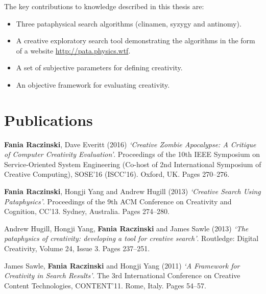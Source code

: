 The key contributions to knowledge described in this thesis are:

\begin{itemize}
  \item Three pataphysical search algorithms (clinamen, syzygy and antinomy).
  \item A creative exploratory search tool demonstrating the algorithms in the form of a website \url{http://pata.physics.wtf}.
  \item A set of subjective parameters for defining creativity.
  \item An objective framework for evaluating creativity.
\end{itemize}

\begin{comment}
  abusing tech in creative ways can yield useful results
  pataphysics = Creativity

  combining the pseudo philosophy of pataphysics with semantically structured algorithms which use programming APIs and computational linguistics to produce original creative works.

  overturn expectations
  subvert browsing
  undermine relevance
  corrupt results
\end{comment}


\section{Publications}

\textbf{Fania Raczinski}, Dave Everitt (2016) \emph{`Creative Zombie Apocalypse: A Critique of Computer Creativity Evaluation'}. Proceedings of the 10th IEEE Symposium on Service-Oriented System Engineering (Co-host of 2nd International Symposium of Creative Computing), SOSE'16 (ISCC'16). Oxford, UK. Pages 270--276.

\textbf{Fania Raczinski}, Hongji Yang and Andrew Hugill (2013) \emph{`Creative Search Using Pataphysics'}. Proceedings of the 9th ACM Conference on Creativity and Cognition, CC'13. Sydney, Australia. Pages 274--280.

Andrew Hugill, Hongji Yang, \textbf{Fania Raczinski} and James Sawle (2013) \emph{`The pataphysics of creativity: developing a tool for creative search'}. Routledge: Digital Creativity, Volume 24, Issue 3. Pages 237--251.

James Sawle, \textbf{Fania Raczinski} and Hongji Yang (2011) \emph{`A Framework for Creativity in Search Results'}. The 3rd International Conference on Creative Content Technologies, CONTENT'11. Rome, Italy. Pages 54--57.

